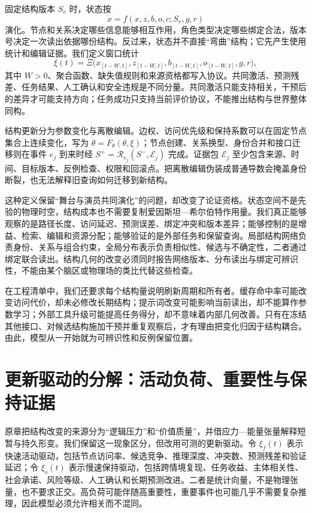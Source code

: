固定结构版本 $S_v$ 时，状态按
\begin{equation}
 \dot x=f(x,z,b,o,c;S_v,g,r)
 \label{eq:state_given_structure}
\end{equation}
演化。节点和关系决定哪些信息能够相互作用，角色类型决定哪些绑定合法，版本号决定一次读出依据哪份结构。反过来，状态并不直接“弯曲”结构；它先产生使用统计和编辑证据。我们定义窗口统计
\begin{equation}
 \xi(t)=\Xi\bigl(x_{[t-W,t]},z_{[t-W,t]},b_{[t-W,t]},o_{[t-W,t]},g,r\bigr),
\end{equation}
其中 $W>0$、聚合函数、缺失值规则和来源资格都写入协议。共同激活、预测残差、任务结果、人工确认和安全违规是不同分量。共同激活只能支持相关，干预后的差异才可能支持方向；任务成功只支持当前评价协议，不能推出结构与世界整体同构。

结构更新分为参数变化与离散编辑。边权、访问优先级和保持系数可以在固定节点集合上连续变化，写为 $\dot\theta=F_\theta(\theta,\xi)$；节点创建、关系换型、身份合并和接口迁移则在事件 $e_j$ 到来时经 $S^+=\mathcal R_{e_j}(S^-,\mathcal E_j)$ 完成。证据包 $\mathcal E_j$ 至少包含来源、时间、目标版本、反例检查、权限和回滚点。把离散编辑伪装成普通导数会掩盖身份断裂，也无法解释旧查询如何迁移到新结构。

这种定义保留“舞台与演员共同演化”的问题，却改变了论证资格。状态空间不是先验的物理时空，结构成本也不需要复制爱因斯坦—希尔伯特作用量。我们真正能够观察的是路径长度、访问延迟、预测误差、绑定冲突和版本差异；能够控制的是增益、检索、编辑和资源分配；能够验证的是外部任务和保留查询。局部结构网络负责身份、关系与组合约束，全局分布表示负责相似性、候选与不确定性，二者通过绑定联合读出。结构几何的改变必须同时报告网络版本、分布读出与绑定可辨识性，不能由某个脑区或物理场的类比代替这些检查。

在工程清单中，我们还要求每个结构量说明刷新周期和所有者。缓存命中率可能改变访问代价，却未必修改长期结构；提示词改变可能影响当前读出，却不能算作参数学习；外部工具升级可能提高任务得分，却不意味着内部几何改善。只有在冻结其他接口、对候选结构施加干预并重复观察后，才有理由把变化归因于结构耦合。由此，模型从一开始就为可辨识性和反例保留位置。

\section{更新驱动的分解：活动负荷、重要性与保持证据}
\label{sec:section_3331}

原章把结构改变的来源分为“逻辑压力”和“价值质量”，并借应力—能量张量解释短暂与持久形变。我们保留这一现象区分，但改用可测的更新驱动。令 $\xi_f(t)$ 表示快速活动驱动，包括节点访问率、候选竞争、推理深度、冲突数、预测残差和验证延迟；令 $\xi_s(t)$ 表示慢速保持驱动，包括跨情境复现、任务收益、主体相关性、社会承诺、风险等级、人工确认和长期预测改进。二者是统计向量，不是物理张量，也不要求正交。高负荷可能伴随高重要性，重要事件也可能几乎不需要复杂推理，因此模型必须允许相关而不混同。

